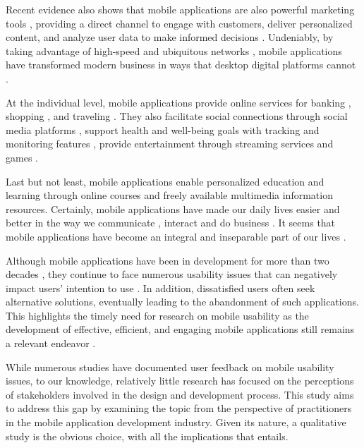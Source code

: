 \documentclass[preprint,12pt,number]{elsarticle}
\begin{document}
Recent evidence also shows that mobile applications are also powerful marketing tools \citep{patsiotis2020influence}, providing a direct channel to engage with customers, deliver personalized content, and analyze user data to make informed decisions \citep{murmann2021design}. Undeniably, by taking advantage of high-speed and ubiquitous networks \citep{borcea2020mobile}, mobile applications have transformed modern business in ways that desktop digital platforms cannot \citep{turban2015mobile}.

At the individual level, mobile applications provide online services for banking \citep{alsmadi2022twenty}, shopping \citep{kim2021information}, and traveling \citep{calvignac2020can}. They also facilitate social connections through social media platforms \citep{humphreys2013mobile}, support health and well-being  goals with tracking and monitoring features \citep{pires2020research}, provide entertainment through streaming services and games \citep{falkowski2020consumption}.

Last but not least, mobile applications enable personalized education \citep{blajda2022application} and learning \citep{arain2018analysis} through online courses and freely available multimedia information resources. Certainly, mobile applications have made our daily lives easier and better in the way we communicate \citep{martin2019impact}, interact \citep{kowal2022digital} and do business \citep{ngai2007review}. It seems that mobile applications have become an integral and inseparable part of our lives \citep{bera2024exploring, Lee2025}.

Although mobile applications have been in development for more than two decades \citep{Pittman2020}, they continue to face numerous usability issues that can negatively impact users' intention to use \citep{coursaris2012impact}. In addition, dissatisfied users often seek alternative solutions, eventually leading to the abandonment of such applications. This highlights the timely need for research on mobile usability as the development of effective, efficient, and engaging mobile applications still remains a relevant endeavor \citep{coursaris2011meta}.

While numerous studies have documented user feedback on mobile usability issues, to our knowledge, relatively little research has focused on the perceptions of stakeholders involved in the design and development process. This study aims to address this gap by examining the topic from the perspective of practitioners in the mobile application development industry. Given its nature, a qualitative study is the obvious choice, with all the implications that entails.
\end{document}
